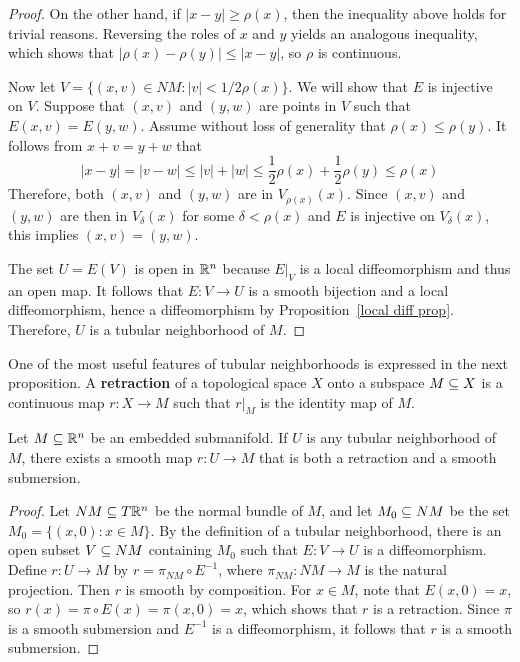 \begin{proof}
On the other hand, if $|x-y|\geq\rho(x)$, then the inequality above holds for trivial reasons. Reversing the roles of $x$ and $y$ yields an analogous inequality, which shows that $|\rho(x)-\rho(y)|\leq|x-y|$, so $\rho$ is continuous.\par
Now let $V=\{(x,v)\in NM:|v|<1/2\rho(x)\}$. We will show that $E$ is injective on $V$. Suppose that $(x,v)$ and $(y,w)$ are points in $V$ such that $E(x,v)=E(y,w)$. Assume without loss of generality that $\rho(x)\leq\rho(y)$. It follows from $x+v=y+w$ that
\[|x-y|=|v-w|\leq|v|+|w|\leq\frac{1}{2}\rho(x)+\frac{1}{2}\rho(y)\leq\rho(x)\]
Therefore, both $(x,v)$ and $(y,w)$ are in $V_{\rho(x)}(x)$. Since $(x,v)$ and $(y,w)$ are then in $V_\delta(x)$ for some $\delta<\rho(x)$ and $E$ is injective on $V_\delta(x)$, this implies $(x,v)=(y,w)$.\par
The set $U=E(V)$ is open in $\mathbb{R}^n$ because $E|_V$ is a local diffeomorphism and thus an open map. It follows that $E:V\to U$ is a smooth bijection and a local diffeomorphism, hence a diffeomorphism by Proposition~\ref{local diff prop}. Therefore, $U$ is a tubular neighborhood of $M$.
\end{proof}
One of the most useful features of tubular neighborhoods is expressed in the next proposition. A \textbf{retraction} of a topological space $X$ onto a subspace $M\subseteq X$ is a continuous map $r:X\to M$ such that $r|_M$ is the identity map of $M$.
\begin{proposition}\label{tubular retraction}
Let $M\subseteq\mathbb{R}^n$ be an embedded submanifold. If $U$ is any tubular neighborhood of $M$, there exists a smooth map $r:U\to M$ that is both a retraction and a smooth submersion.
\end{proposition}
\begin{proof}
Let $NM\subseteq T\mathbb{R}^n$ be the normal bundle of $M$, and let $M_0\subseteq NM$ be the set $M_0=\{(x,0):x\in M\}$. By the definition of a tubular neighborhood, there is an open 
subset $V\subseteq NM$ containing $M_0$ such that $E:V\to U$ is a diffeomorphism. Define $r:U\to M$ by $r=\pi_{NM}\circ E^{-1}$, where $\pi_{NM}:NM\to M$ is the natural
projection. Then $r$ is smooth by composition. For $x\in M$, note that $E(x,0)=x$, so $r(x)=\pi\circ E(x)=\pi(x,0)=x$, which shows that $r$ is a retraction. Since 
$\pi$ is a smooth submersion and $E^{-1}$ is a diffeomorphism, it follows that $r$ is a smooth submersion.
\end{proof}
